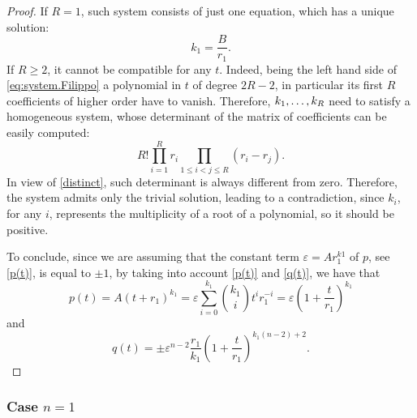 \documentclass[11pt, reqno]{amsart}
\newcommand{\e}{\varepsilon}
\begin{document}
\begin{proof}
If $R=1$, such system consists of just one equation, which  has a unique solution: 
$$k_1=\frac{B}{r_1}.$$
If $R\geq 2$, it cannot be compatible for any $t$. Indeed, being the left hand side of \eqref{eq:system.Filippo} a polynomial in $t$ of degree $2R-2$,  in particular its first $R$ coefficients of higher order have to vanish. Therefore, $k_1,\mathellipsis,k_R$ need to satisfy a homogeneous system, whose  determinant of the matrix of coefficients can be easily computed:
$$
R!\prod_{i=1}^R r_i\prod_{1\leq i<j\leq R}(r_i-r_j).
$$
In view of \eqref{distinct}, such determinant is always different from zero. Therefore,  the system admits only the trivial solution, leading to a contradiction, since $k_i$, for any $i$, represents the multiplicity of a root of a polynomial, so it should be positive.

To conclude, since we are assuming that the constant term $\e=Ar_1^{k1}$ of $p$, see \eqref{p(t)}, is equal to $\pm1$,  by taking  into  account \eqref{p(t)} and \eqref{q(t)},  we have  that
$$p(t)=A(t+r_1)^{k_1}=\e\sum_{i=0}^{k_1}\binom{k_1}{i}t^i r_1^{-i}=\e\left( 1+\frac{t}{r_1}\right)^{k_1}$$
and
\begin{equation}\label{q}
q(t)=\pm \e^{n-2} \frac{ r_1}{k_1} \left( 1+\frac{t}{r_1}\right)^{k_1(n-2)+2}.\end{equation}
\end{proof}
%
%
%
%
%
\subsubsection{\textbf{Case $n=1$}}\label{sec.n1}

\
\end{document}
